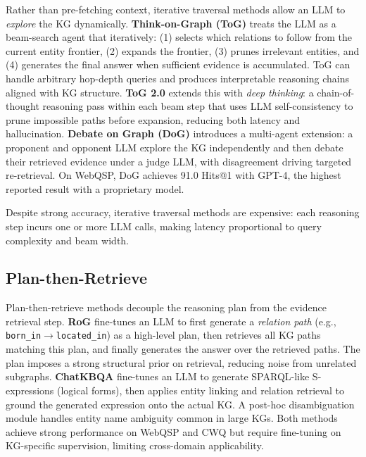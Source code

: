 \documentclass[11pt]{article}
\begin{document}
Rather than pre-fetching context, iterative traversal methods allow an LLM to \emph{explore} the KG dynamically. \textbf{Think-on-Graph (ToG)} \cite{sun2024tog} treats the LLM as a beam-search agent that iteratively: (1) selects which relations to follow from the current entity frontier, (2) expands the frontier, (3) prunes irrelevant entities, and (4) generates the final answer when sufficient evidence is accumulated. ToG can handle arbitrary hop-depth queries and produces interpretable reasoning chains aligned with KG structure. \textbf{ToG 2.0} \cite{ma2025tog2} extends this with \emph{deep thinking}: a chain-of-thought reasoning pass within each beam step that uses LLM self-consistency to prune impossible paths before expansion, reducing both latency and hallucination. \textbf{Debate on Graph (DoG)} \cite{ma2025dog} introduces a multi-agent extension: a proponent and opponent LLM explore the KG independently and then debate their retrieved evidence under a judge LLM, with disagreement driving targeted re-retrieval. On WebQSP, DoG achieves 91.0 Hits@1 with GPT-4, the highest reported result with a proprietary model.

Despite strong accuracy, iterative traversal methods are expensive: each reasoning step incurs one or more LLM calls, making latency proportional to query complexity and beam width.

\subsection{Plan-then-Retrieve}
\label{sec:plan}

Plan-then-retrieve methods decouple the reasoning plan from the evidence retrieval step. \textbf{RoG} \cite{luo2024rog} fine-tunes an LLM to first generate a \emph{relation path} (e.g., \texttt{born\_in}$\rightarrow$\texttt{located\_in}) as a high-level plan, then retrieves all KG paths matching this plan, and finally generates the answer over the retrieved paths. The plan imposes a strong structural prior on retrieval, reducing noise from unrelated subgraphs. \textbf{ChatKBQA} \cite{luo2024chatkbqa} fine-tunes an LLM to generate SPARQL-like S-expressions (logical forms), then applies entity linking and relation retrieval to ground the generated expression onto the actual KG. A post-hoc disambiguation module handles entity name ambiguity common in large KGs. Both methods achieve strong performance on WebQSP and CWQ but require fine-tuning on KG-specific supervision, limiting cross-domain applicability.
\end{document}
